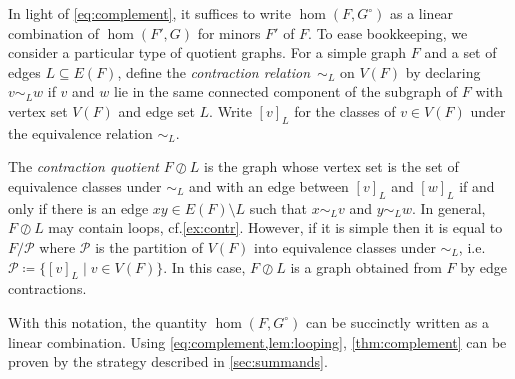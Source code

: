 \documentclass[3p,final]{elsarticle}
\begin{document}
	
	In light of \cref{eq:complement}, it suffices to write $\hom(F, G^\circ)$ as a linear combination of $\hom(F', G)$ for minors $F'$ of $F$.
	To ease bookkeeping, we consider a particular type of quotient graphs.
	For a simple graph $F$ and a set of edges $L \subseteq E(F)$, define the \emph{contraction relation}~$\sim_L$ on $V(F)$ by declaring $v \sim_L w$ if
	$v$ and $w$ lie in the same connected component of the subgraph of $F$ with vertex set $V(F)$ and edge set $L$.
	Write $[v]_L$ for the classes of $v \in V(F)$ under the equivalence relation $\sim_L$.
	
	The \emph{contraction quotient} $F \oslash L$ is the graph whose vertex set is the set of equivalence classes under $\sim_L$ and with an edge between $[v]_L$ and $[w]_L$ if and only if there is an edge $xy \in E(F) \setminus L$ such that $x \sim_L v$ and $y \sim_L w$. 
	In general, $F \oslash L$ may contain loops, cf.\@ \cref{ex:contr}. However, if it is simple then it is equal to $F/\mathcal{P}$ where $\mathcal{P}$ is the partition of $V(F)$ into equivalence classes under $\sim_L$, i.e.\@ $\mathcal{P} \coloneqq \{[v]_L \mid v \in V(F)\}$. In this case, $F \oslash L$ is a graph obtained from $F$ by edge contractions.
	
	With this notation, the quantity $\hom(F, G^\circ)$ can be succinctly written as a linear combination.
	Using \cref{eq:complement,lem:looping}, \cref{thm:complement} can be proven by the strategy described in \cref{sec:summands}.
	
\end{document}
